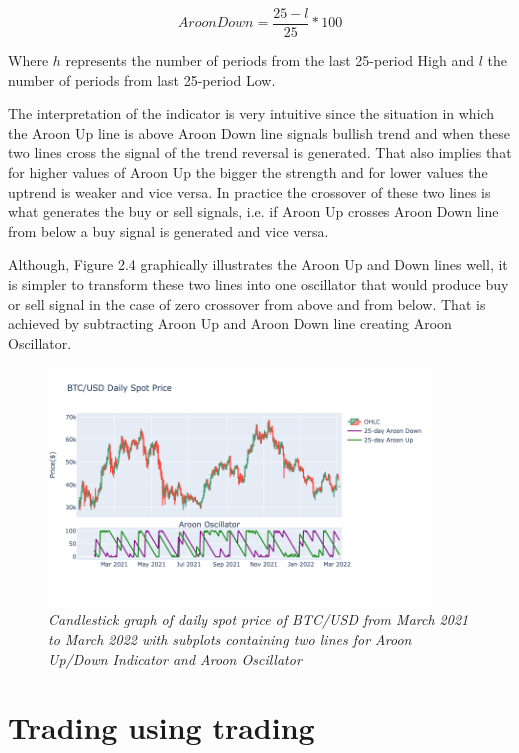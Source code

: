 \begin{equation}
Aroon Down = \frac{25 - l}{25} * 100
\end{equation}

Where $h$ represents the number of periods from the last 25-period High and $l$ the number of periods from last 25-period Low. 

The interpretation of the indicator is very intuitive since the situation in which the Aroon Up line is above Aroon Down line signals bullish trend and when these two lines cross the signal of the trend reversal is generated. That also implies that for higher values of Aroon Up the bigger the strength and for lower values the uptrend is weaker and vice versa. In practice the crossover of these two lines is what generates the buy or sell signals, i.e. if Aroon Up crosses Aroon Down line from below a buy signal is generated and vice versa. 

Although, Figure 2.4 graphically illustrates the Aroon Up and Down lines well, it is simpler to transform these two lines into one oscillator that would produce buy or sell signal in the case of zero crossover from above and from below. That is achieved by subtracting Aroon Up and Aroon Down line creating Aroon Oscillator.


\begin{figure}[h]

\begin{center}
	\includegraphics[width=0.9\textwidth]{Aroon.png}
\end{center}

\caption{\textit{ Candlestick graph of daily spot price of BTC/USD from March 2021 to March 2022 with subplots containing two lines for Aroon Up/Down Indicator and Aroon Oscillator}}

\end{figure}


\newpage

\section{Trading using trading}








